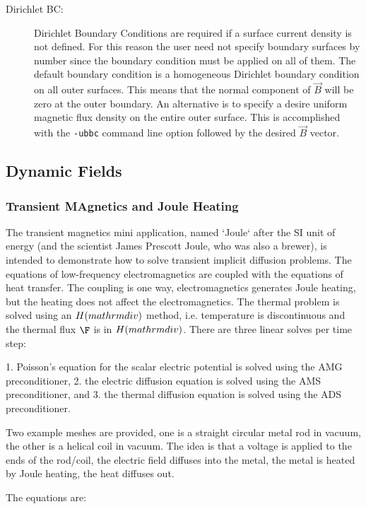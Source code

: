 \documentclass{article}
\begin{document}
\begin{description}
\item[Dirichlet BC:] Dirichlet Boundary Conditions are required if a
  surface current density is not defined.  For this reason the user
  need not specify boundary surfaces by number since the boundary
  condition must be applied on all of them.  The default boundary
  condition is a homogeneous Dirichlet boundary condition on all outer
  surfaces.  This means that the normal component of $\vec{B}$ will be
  zero at the outer boundary.  An alternative is to specify a desire
  uniform magnetic flux density on the entire outer surface.  This is
  accomplished with the {\tt -ubbc} command line option followed by
  the desired $\vec{B}$ vector.
\end{description}


\subsection{Dynamic Fields}
\subsubsection{Transient MAgnetics and Joule Heating}
The transient magnetics mini application, named `Joule` after the SI unit of energy (and the
scientist James Prescott Joule, who was also a brewer), is intended to demonstrate how to solve
transient implicit diffusion problems. The equations of low-frequency electromagnetics are coupled
with the equations of heat transfer. The coupling is one way, electromagnetics generates Joule
heating, but the heating does not affect the electromagnetics.  The thermal problem
is solved using an $H(\\mathrm{div})$ method, i.e. temperature is discontinuous and the
thermal flux $\F$ is in $H(\\mathrm{div})$.
There are three linear solves per time step:

1. Poisson's equation for the scalar electric potential is solved using the AMG
 preconditioner,
2. the electric diffusion equation is solved using the AMS preconditioner, and
3. the thermal diffusion equation is solved using the ADS preconditioner.

Two example meshes are provided, one is a straight circular metal rod in vacuum, the other is a helical
coil in vacuum. The idea is that a voltage is applied to the ends of the rod/coil, the electric field diffuses
into the metal, the metal is heated by Joule heating, the heat diffuses out.

The equations are:
\end{document}
